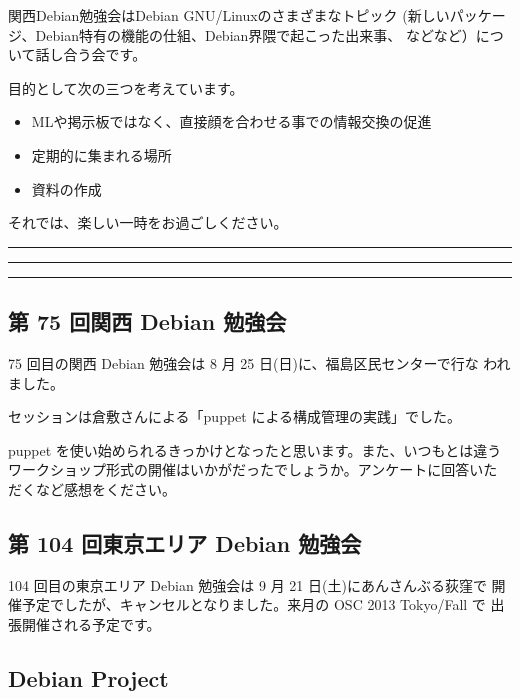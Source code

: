 \documentclass[mingoth,a4paper]{jsarticle}
\begin{document}
 関西Debian勉強会はDebian GNU/Linuxのさまざまなトピック
 (新しいパッケージ、Debian特有の機能の仕組、Debian界隈で起こった出来事、
 などなど）について話し合う会です。

 目的として次の三つを考えています。
 \begin{itemize}
  \item MLや掲示板ではなく、直接顔を合わせる事での情報交換の促進
  \item 定期的に集まれる場所
  \item 資料の作成
 \end{itemize}

 それでは、楽しい一時をお過ごしください。

\newpage

\begin{minipage}[b]{0.2\hsize}
 {}
\end{minipage}
\begin{minipage}[b]{0.8\hsize}
\hrule
\vspace{2mm}
\hrule
\setcounter{tocdepth}{1}
\tableofcontents
\vspace{2mm}
\hrule
\end{minipage}


\subsection{第 75 回関西 Debian 勉強会}

75 回目の関西 Debian 勉強会は 8 月 25 日(日)に、福島区民センターで行な
われました。

セッションは倉敷さんによる「puppet による構成管理の実践」でした。

puppet を使い始められるきっかけとなったと思います。また、いつもとは違う
ワークショップ形式の開催はいかがだったでしょうか。アンケートに回答いた
だくなど感想をください。

\subsection{第 104 回東京エリア Debian 勉強会}
104 回目の東京エリア Debian 勉強会は 9 月 21 日(土)にあんさんぶる荻窪で
開催予定でしたが、キャンセルとなりました。来月の OSC 2013 Tokyo/Fall で
出張開催される予定です。

\subsection{Debian Project}
\end{document}
